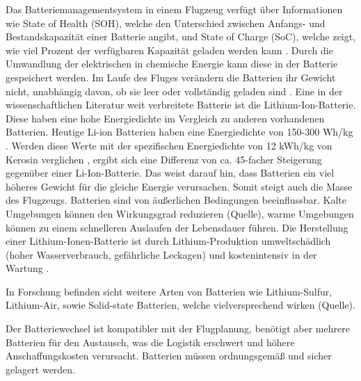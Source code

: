 Das Batteriemanagementsystem in einem Flugzeug verfügt über Informationen wie State of Health (SOH), welche den Unterschied zwischen Anfangs-
und Bestandskapazität einer Batterie angibt, und State of Charge (SoC), welche zeigt, wie viel Prozent der verfügbaren Kapazität geladen werden kann \cite{donckers2024electric}.
Durch die Umwandlung der elektrischen in chemische Energie kann diese in der Batterie gespeichert werden.
Im Laufe des Fluges verändern die Batterien ihr Gewicht nicht, unabhängig davon, ob sie leer oder vollständig geladen sind \cite{donckers2024electric}. 
Eine in der wissenschaftlichen Literatur weit verbreitete Batterie ist die Lithium-Ion-Batterie. Diese haben eine hohe Energiedichte im Vergleich zu anderen vorhandenen Batterien. %
Heutige Li-ion Batterien haben eine Energiedichte von 150-300 Wh/kg \cite{colpan2022fuel}. Werden diese Werte mit der spezifischen Energiedichte von 12 kWh/kg von Kerosin verglichen \cite{dalmia2022powering},
ergibt sich eine Differenz von ca. 45-facher Steigerung gegenüber einer Li-Ion-Batterie. Das weist darauf hin, dass Batterien ein viel höheres Gewicht für die gleiche Energie verursachen. 
Somit steigt auch die Masse des Flugzeugs.
Batterien sind von äußerlichen Bedingungen beeinflussbar. Kalte Umgebungen können 
den Wirkungsgrad reduzieren (Quelle), warme Umgebungen können zu einem schnelleren Auslaufen der Lebensdauer führen. 
Die Herstellung einer Lithium-Ionen-Batterie ist durch Lithium-Produktion umweltschädlich (hoher Wasserverbrauch, gefährliche Leckagen) und 
kostenintensiv in der Wartung \cite{dalmia2022powering}. 


In Forschung befinden sicht weitere Arten von Batterien wie Lithium-Sulfur, Lithium-Air, sowie Solid-state Batterien, welche vielversprechend wirken (Quelle).
%
%

Der Batteriewechsel ist kompatibler mit der Flugplanung, benötigt aber mehrere Batterien für den Austausch, was die Logistik erschwert 
und höhere Anschaffungskosten verursacht. Batterien müssen ordnungsgemäß und sicher gelagert werden. \cite{salucci2020optimal}

